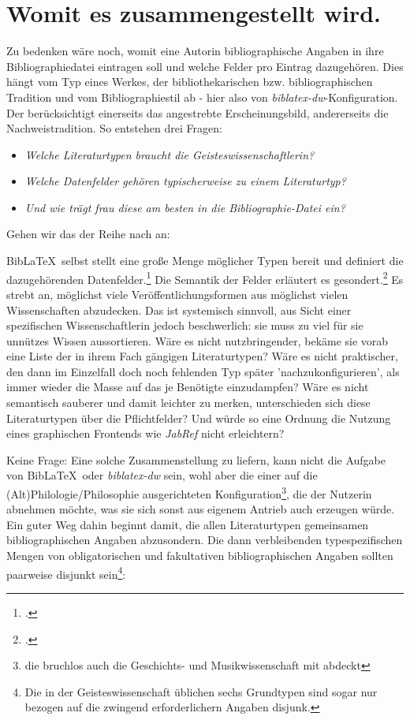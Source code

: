 \section{Womit es zusammengestellt wird.}

Zu bedenken wäre noch, womit eine Autorin bibliographische Angaben in ihre Bibliographiedatei eintragen soll und welche Felder pro Eintrag dazugehören. Dies hängt vom Typ eines Werkes, der bibliothekarischen bzw. bibliographischen Tradition und vom Bibliographiestil ab - hier also von \emph{biblatex-dw}-Konfiguration. Der berücksichtigt einerseits das angestrebte Erscheinungsbild, andererseits die Nachweistradition. So entstehen drei Fragen:
\begin{itemize}
  \item \emph{Welche Literaturtypen braucht die Geisteswissenschaftlerin?}
  \item \emph{Welche Datenfelder gehören typischerweise zu einem Literaturtyp?}
  \item \emph{Und wie trägt frau diese am besten in die Bibliographie-Datei ein?}
\end{itemize}

Gehen wir das der Reihe nach an:

Bib\LaTeX\ selbst stellt eine große Menge möglicher Typen bereit und definiert die dazugehörenden Datenfelder.\footcite[vgl.][S. 8ff]{BibLaTeX2021a} Die Semantik der Felder erläutert es gesondert.\footcite[vgl.][S. 33ff]{BibLaTeX2021a} Es strebt an, möglichst viele Veröffentlichungsformen aus möglichst vielen Wissenschaften abzudecken. Das ist systemisch sinnvoll, aus Sicht einer spezifischen Wissenschaftlerin jedoch beschwerlich: sie muss zu viel für sie unnützes Wissen aussortieren. Wäre es nicht nutzbringender, bekäme sie vorab eine Liste der in ihrem Fach gängigen Literaturtypen? Wäre es nicht praktischer, den dann im Einzelfall doch noch fehlenden Typ später 'nachzukonfigurieren', als immer wieder die Masse auf das je Benötigte einzudampfen? Wäre es nicht semantisch sauberer und damit leichter zu merken, unterschieden sich diese Literaturtypen über die Pflichtfelder? Und würde so eine Ordnung die Nutzung eines graphischen Frontends wie \emph{JabRef} nicht erleichtern?

Keine Frage: Eine solche Zusammenstellung zu liefern, kann nicht die Aufgabe von Bib\LaTeX\ oder \emph{biblatex-dw} sein, wohl aber die einer auf die (Alt)Philologie/Philosophie ausgerichteten Konfiguration\footnote{die bruchlos auch die Geschichts- und Musikwissenschaft mit abdeckt}, die der Nutzerin abnehmen möchte, was sie sich sonst aus eigenem Antrieb auch erzeugen würde. Ein guter Weg dahin beginnt damit, die allen Literaturtypen gemeinsamen  bibliographischen Angaben abzusondern. Die dann verbleibenden typespezifischen Mengen von obligatorischen und fakultativen bibliographischen Angaben sollten paarweise disjunkt sein\footnote{Die in der Geisteswissenschaft üblichen sechs Grundtypen sind sogar nur bezogen auf die zwingend erforderlichern Angaben disjunk.}:

